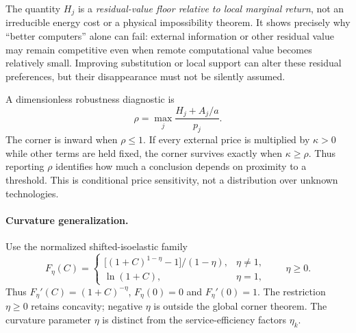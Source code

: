 The quantity $H_j$ is a \emph{residual-value floor relative to local marginal return}, not an irreducible energy cost or a physical impossibility theorem. It shows precisely why ``better computers'' alone can fail: external information or other residual value may remain competitive even when remote computational value becomes relatively small. Improving substitution or local support can alter these residual preferences, but their disappearance must not be silently assumed.

A dimensionless robustness diagnostic is
\begin{equation}
 \rho=\max_j\frac{H_j+A_j/a}{p_j}.
 \label{eq:rho}
\end{equation}
The corner is inward when $\rho\leq1$. If every external price is multiplied by $\kappa>0$ while other terms are held fixed, the corner survives exactly when $\kappa\geq\rho$. Thus reporting $\rho$ identifies how much a conclusion depends on proximity to a threshold. This is conditional price sensitivity, not a distribution over unknown technologies.

\paragraph{Curvature generalization.}

Use the normalized shifted-isoelastic family
\begin{equation}
 F_\eta(C)=
 \begin{cases}
 \big[(1+C)^{1-\eta}-1\big]/(1-\eta),&\eta\neq1,\\
 \ln(1+C),&\eta=1,
 \end{cases}
 \qquad \eta\geq0.
 \label{eq:isoelastic}
\end{equation}
Thus $F_\eta'(C)=(1+C)^{-\eta}$, $F_\eta(0)=0$ and
$F_\eta'(0)=1$. The restriction $\eta\geq0$ retains concavity;
negative $\eta$ is outside the global corner theorem. The curvature
parameter $\eta$ is distinct from the service-efficiency factors $\eta_k$.

